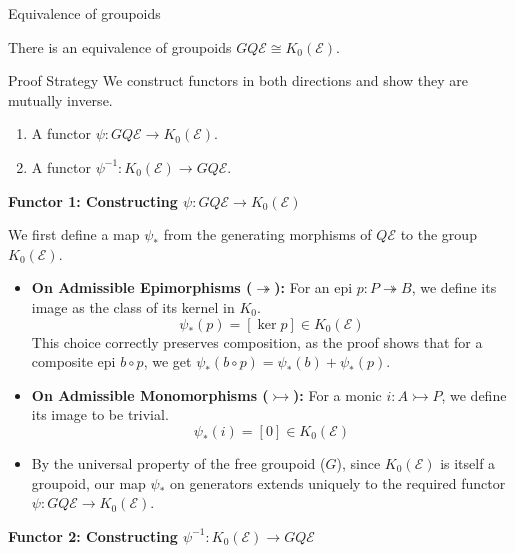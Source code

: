 \documentclass[10pt]{beamer}
\begin{document}
\begin{frame}{Equivalence of groupoids}
	\begin{theorem}
		There is an equivalence of groupoids $GQ\mathcal{E} \cong K_0(\mathcal{E})$.
	\end{theorem}	
	\pagebreak
	
	\begin{alertblock}{Proof Strategy}
		We construct functors in both directions and show they are mutually inverse.
		\begin{enumerate}
			\item A functor $\psi: GQ\mathcal{E} \to K_0(\mathcal{E})$.
			\item A functor $\psi^{-1}: K_0(\mathcal{E}) \to GQ\mathcal{E}$.
		\end{enumerate}
	\end{alertblock}
	
	
	
	\textbf{Functor 1: Constructing $\psi: GQ\mathcal{E} \to K_0(\mathcal{E})$}
	
	We first define a map $\psi_*$ from the generating morphisms of $Q\mathcal{E}$ to the group $K_0(\mathcal{E})$.
	
	\begin{itemize}
		\item \textbf{On Admissible Epimorphisms ($\twoheadrightarrow$):} For an epi $p: P \twoheadrightarrow B$, we define its image as the class of its kernel in $K_0$.
		\[ \psi_*(p) = [\ker p] \in K_0(\mathcal{E}) \]
		This choice correctly preserves composition, as the proof shows that for a composite epi $b \circ p$, we get $\psi_*(b \circ p) = \psi_*(b) + \psi_*(p)$.
		
		
		
		\item \textbf{On Admissible Monomorphisms ($\rightarrowtail$):} For a monic $i: A \rightarrowtail P$, we define its image to be trivial.
		\[ \psi_*(i) = [0] \in K_0(\mathcal{E}) \]
		
		\item By the universal property of the free groupoid ($G$), since $K_0(\mathcal{E})$ is itself a groupoid, our map $\psi_*$ on generators extends uniquely to the required functor $\psi: GQ\mathcal{E} \to K_0(\mathcal{E})$.
	\end{itemize}
	
	
	
	\textbf{Functor 2: Constructing $\psi^{-1}: K_0(\mathcal{E}) \to GQ\mathcal{E}$}
	

\end{frame}
\end{document}
